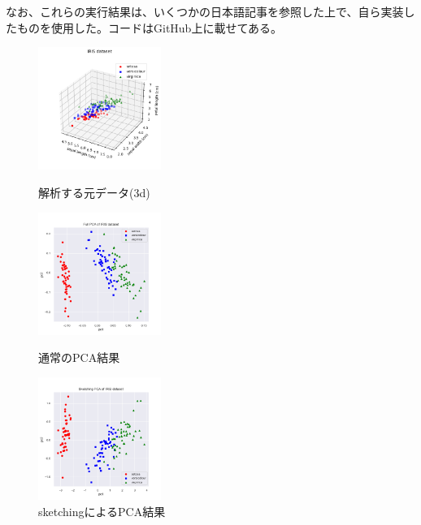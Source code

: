 \documentclass[10pt]{article}
\begin{document}
なお、これらの実行結果は、いくつかの日本語記事\cite{hidoJinNiannoSIGKDDbesutopepawoShiZhuangGongKaisitemimasita2013}\cite{takayanagiLunWenDundaSimpleDeterministic2019}を参照した上で、自ら実装したものを使用した。コードはGitHub上に載せてある\cite{hamaguchiApplyingForGraduateSchool2023}。

\begin{figure}[htbp]
    \begin{minipage}{0.33\hsize}
        \begin{center}
            \includegraphics[width=40mm]{iris_3d.png}
        \end{center}
        \caption{解析する元データ(3d)}
        \label{img:iris_3d}
    \end{minipage}
    \begin{minipage}{0.33\hsize}
        \begin{center}
            \includegraphics[width=40mm]{iris_full_pca.png}
        \end{center}
        \caption{通常のPCA結果}
        \label{img:iris_full_pca}
    \end{minipage}
    \begin{minipage}{0.33\hsize}
        \begin{center}
            \includegraphics[width=40mm]{iris_sketching_pca.png}
        \end{center}
        \caption{sketchingによるPCA結果}
        \label{img:iris_sketching_pca}
    \end{minipage}
\end{figure}
\end{document}
